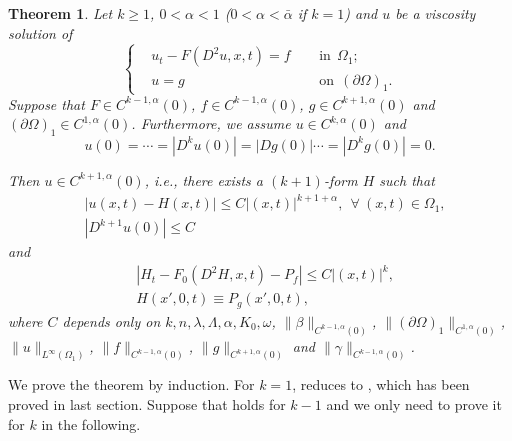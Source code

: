 \documentclass[preprint,12pt]{elsarticle}
\newtheorem{theorem}{Theorem}[section]
\theoremstyle{definition}
\theoremstyle{remark}
\numberwithin{equation}{section}
\begin{document}
\begin{theorem}\label{t.Cka.1}
Let $k\geq 1$, $0<\alpha<1$ ($0<\alpha<\bar{\alpha}$ if $k=1$) and $u$ be a viscosity solution of
\begin{equation*}
\left\{\begin{aligned}
&u_t-F(D^2 u,x,t)=f&& ~~\mbox{in}~~\Omega_1;\\
&u=g&& ~~\mbox{on}~~(\partial \Omega)_1.
\end{aligned}\right.
\end{equation*}
Suppose that $F\in C^{k-1,\alpha}(0)$, $f\in C^{k-1,\alpha}(0)$, $g\in C^{k+1,\alpha}(0)$ and $(\partial \Omega)_1\in C^{1,\alpha}(0)$. Furthermore, we assume $u\in C^{k,\alpha}(0)$ and
\begin{equation}\label{e.Dkg}
u(0)=\cdots=|D^ku(0)|=|Dg(0)|\cdots=|D^kg(0)|=0.
\end{equation}

Then $u\in C^{k+1,\alpha}(0)$, i.e., there exists a $(k+1)$-form $H$ such that
\begin{equation}\label{e.Cka.u1}
  \begin{aligned}
&|u(x,t)-H(x,t)|\leq C |(x,t)|^{k+1+\alpha},~~\forall ~(x,t)\in \Omega_{1},\\
&|D^{k+1}u(0)|\leq C
  \end{aligned}
\end{equation}
and
\begin{equation}\label{e.Cka.u2}
  \begin{aligned}
    &|H_t-F_0(D^2 H,x,t)-P_f|\leq C|(x,t)|^{k},\\
    &H(x',0,t)\equiv P_g(x',0,t),
  \end{aligned}
\end{equation}
where $C$ depends only on $k,n,\lambda, \Lambda, \alpha,K_0,\omega$, $\|\beta\|_{C^{k-1,\alpha}(0)}$, $\|(\partial \Omega)_1\|_{C^{1,\alpha}(0)}$, $\|u\|_{L^{\infty}(\Omega_{1})}$, $\|f\|_{C^{k-1,\alpha}(0)}$, $\|g\|_{C^{k+1,\alpha}(0)}$ and $\|\gamma\|_{C^{k-1,\alpha}(0)}$.
\end{theorem}

We prove the theorem by induction. For $k=1$,  reduces to , which has been proved in last section. Suppose that  holds for $k-1$ and we only need to prove it for $k$ in the following.
\end{document}
